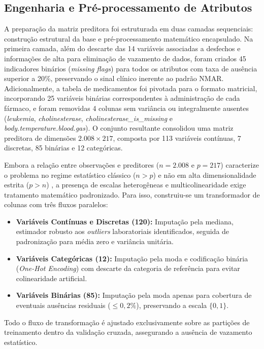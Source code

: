\documentclass[conference]{IEEEtran}
\begin{document}
\subsection{Engenharia e Pré-processamento de Atributos}
A preparação da matriz preditora foi estruturada em duas camadas sequenciais: construção estrutural da base e pré-processamento matemático encapsulado. Na primeira camada, além do descarte das 14 variáveis associadas a desfechos e informações de alta para eliminação de vazamento de dados, foram criados 45 indicadores binários (\textit{missing flags}) para todos os atributos com taxa de ausência superior a 20\%, preservando o sinal clínico inerente ao padrão NMAR. Adicionalmente, a tabela de medicamentos foi pivotada para o formato matricial, incorporando 25 variáveis binárias correspondentes à administração de cada fármaco, e foram removidas 4 colunas sem variância ou integralmente ausentes (\textit{leukemia}, \textit{cholinesterase}, \textit{cholinesterase\_is\_missing} e \textit{body.temperature.blood.gas}). O conjunto resultante consolidou uma matriz preditora de dimensões $2.008 \times 217$, composta por 113 variáveis contínuas, 7 discretas, 85 binárias e 12 categóricas.

Embora a relação entre observações e preditores ($n = 2.008$ e $p = 217$) caracterize o problema no regime estatístico clássico ($n > p$) e não em alta dimensionalidade estrita ($p > n$) \cite{b4}, a presença de escalas heterogêneas e multicolinearidade exige tratamento matemático padronizado. Para isso, construiu-se um transformador de colunas com três fluxos paralelos:
\begin{itemize}
    \item \textbf{Variáveis Contínuas e Discretas (120):} Imputação pela mediana, estimador robusto aos \textit{outliers} laboratoriais identificados, seguida de padronização para média zero e variância unitária.
    \item \textbf{Variáveis Categóricas (12):} Imputação pela moda e codificação binária (\textit{One-Hot Encoding}) com descarte da categoria de referência para evitar colinearidade artificial.
    \item \textbf{Variáveis Binárias (85):} Imputação pela moda apenas para cobertura de eventuais ausências residuais ($\le 0,2\%$), preservando a escala $\{0, 1\}$.
\end{itemize}
Todo o fluxo de transformação é ajustado exclusivamente sobre as partições de treinamento dentro da validação cruzada, assegurando a ausência de vazamento estatístico.
\end{document}
